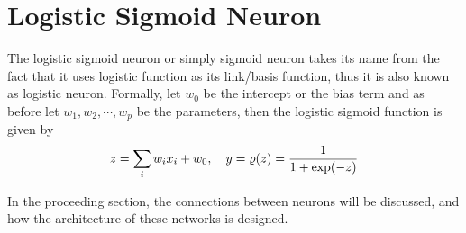 \section{Logistic Sigmoid Neuron}\label{sec:sln}
The logistic sigmoid neuron or simply sigmoid neuron takes its name from the fact that it uses logistic function as its link/basis function, thus it is also known as logistic neuron. Formally, let $w_0$ be the intercept or the bias term and as before let $w_1,w_2,\cdots,w_p$ be the parameters, then the logistic sigmoid function is given by
\begin{equation}\label{eq:logsig}
z=\sum_{i}w_ix_i+w_0,\quad y=\varrho(z)=\frac{1}{1+\exp(-z)}
\end{equation}

In the proceeding section, the connections between neurons will be discussed, and how the architecture of these networks is designed.

